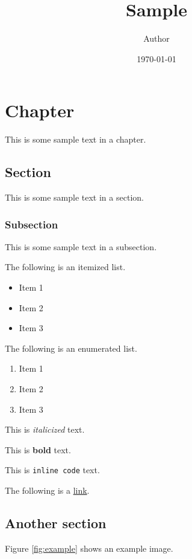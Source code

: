 \documentclass[14pt, bibliography=totoc, index=totoc, listof=totoc]{report}
\title{Sample}
\author{Author}
\date{\today}
\begin{document}
\maketitle %

\tableofcontents

\listoffigures



\chapter{Chapter}
This is some sample text in a chapter.

\section{Section}
This is some sample text in a section.

\subsection{Subsection}
This is some sample text in a subsection.

The following is an itemized list.
\begin{itemize}
    \item Item 1
    \item Item 2
    \item Item 3
\end{itemize}

The following is an enumerated list.
\begin{enumerate}
    \item Item 1
    \item Item 2
    \item Item 3
\end{enumerate}

This is \textit{italicized} text.

This is \textbf{bold} text.

This is \verb|inline code| text.

The following is a \href{https://www.linux.org/}{link}.

\pagebreak
\section{Another section}
Figure \ref{fig:example} shows an example image.
\end{document}
